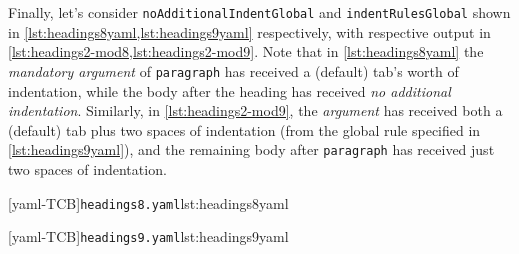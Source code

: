  \begin{example}
 Finally, let's consider \texttt{noAdditionalIndentGlobal} and \texttt{indentRulesGlobal}
 shown in \cref{lst:headings8yaml,lst:headings9yaml} respectively, with respective output
 in \cref{lst:headings2-mod8,lst:headings2-mod9}. Note that in \cref{lst:headings8yaml}
 the \emph{mandatory argument} of \texttt{paragraph} has received a (default) tab's worth
 of indentation, while the body after the heading has received \emph{no additional
 indentation}. Similarly, in \cref{lst:headings2-mod9}, the \emph{argument} has received
 both a (default) tab plus two spaces of indentation (from the global rule specified in
 \cref{lst:headings9yaml}), and the remaining body after \texttt{paragraph} has received
 just two spaces of indentation.

 \begin{cmhtcbraster}
  [yaml-TCB]{\texttt{headings8.yaml}}{lst:headings8yaml}
 \end{cmhtcbraster}

 \begin{cmhtcbraster}
  [yaml-TCB]{\texttt{headings9.yaml}}{lst:headings9yaml}
 \end{cmhtcbraster}
 \end{example}
